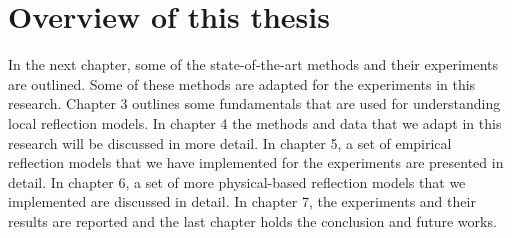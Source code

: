 \section{Overview of this thesis}
In the next chapter, some of the state-of-the-art methods and their experiments are outlined. Some of these methods are adapted for the experiments in this research. Chapter 3 outlines some fundamentals that are used for understanding local reflection models. In chapter 4 the methods and data that we adapt in this research will be discussed in more detail. In chapter 5, a set of empirical reflection models that we have implemented for the experiments are presented in detail. In chapter 6, a set of more physical-based reflection models that we implemented are discussed in detail. In chapter 7, the experiments and their results are reported and the last chapter holds the conclusion and future works.

